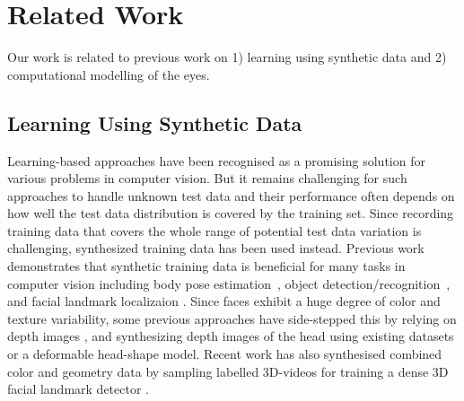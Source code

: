 
\section{Related Work}

Our work is related to previous work on 1) learning using synthetic data and 2) computational modelling of the eyes.

\subsection{Learning Using Synthetic Data}

Learning-based approaches have been recognised as a promising solution for various problems in computer vision.
But it remains challenging for such approaches to handle unknown test data and their performance often depends on how well the test data distribution is covered by the training set.
Since recording training data that covers the whole range of potential test data variation is challenging,
synthesized training data has been used instead.
Previous work demonstrates that synthetic training data is beneficial for many tasks in computer vision including body pose estimation~\cite{okada2008relevant,shotton2013real}, object detection/recognition~\cite{yu2010improving,liebelt2010multiview}, and facial landmark localizaion \cite{kaneva2011evaluation,baltrusaitis20123d,zface}.
%
Since faces exhibit a huge degree of color and texture variability, some previous approaches have side-stepped this by relying on depth images \cite{baltrusaitis20123d,fanelli2011real}, and synthesizing depth images of the head using existing datasets or a deformable head-shape model. Recent work has also synthesised combined color and geometry data by sampling labelled 3D-videos for training a dense 3D facial landmark detector \cite{zface}.

